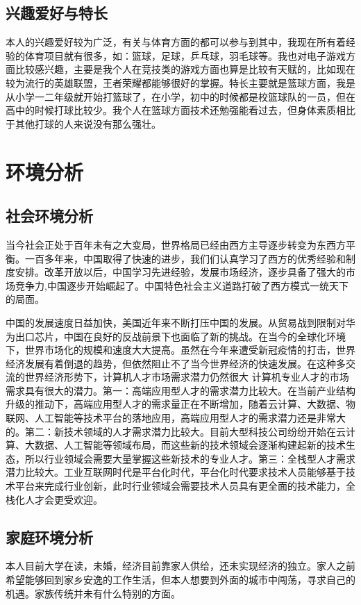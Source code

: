 \documentclass{article}
\begin{document}
\subsection{兴趣爱好与特长}
本人的兴趣爱好较为广泛，有关与体育方面的都可以参与到其中，我现在所有着经验的体育项目就有很多，如：篮球，足球，乒乓球，羽毛球等。我也对电子游戏方面比较感兴趣，主要是我个人在竞技类的游戏方面也算是比较有天赋的，比如现在较为流行的英雄联盟，王者荣耀都能够很好的掌握。特长主要就是篮球方面，我是从小学一二年级就开始打篮球了，在小学，初中的时候都是校篮球队的一员，但在高中的时候打球比较少。我个人在篮球方面技术还勉强能看过去，但身体素质相比于其他打球的人来说没有那么强壮。
\section{环境分析}
\subsection{社会环境分析}
当今社会正处于百年未有之大变局，世界格局已经由西方主导逐步转变为东西方平衡。一百多年来，中国取得了快速的进步，我们们认真学习了西方的优秀经验和制度安排。改革开放以后，中国学习先进经验，发展市场经济，逐步具备了强大的市场竞争力,中国逐步开始崛起了。中国特色社会主义道路打破了西方模式一统天下的局面。\par
中国的发展速度日益加快，美国近年来不断打压中国的发展。从贸易战到限制对华为出口芯片，中国在良好的反战前景下也面临了新的挑战。在当今的全球化环境下，世界市场化的规模和速度大大提高。虽然在今年来遭受新冠疫情的打击，世界经济发展有着倒退的趋势，但依然阻止不了当今世界经济的快速发展。在这种多交流的世界经济形势下，计算机人才市场需求潜力仍然很大 计算机专业人才的市场需求具有很大的潜力。第一：高端应用型人才的需求潜力比较大。在当前产业结构升级的推动下，高端应用型人才的需求量正在不断增加，随着云计算、大数据、物联网、人工智能等技术平台的落地应用，高端应用型人才的需求潜力还是非常大的。第二：新技术领域的人才需求潜力比较大。目前大型科技公司纷纷开始在云计算、大数据、人工智能等领域布局，而这些新的技术领域会逐渐构建起新的技术生态，所以行业领域会需要大量掌握这些新技术的专业人才。第三：全栈型人才需求潜力比较大。工业互联网时代是平台化时代，平台化时代要求技术人员能够基于技术平台来完成行业创新，此时行业领域会需要技术人员具有更全面的技术能力，全栈化人才会更受欢迎。
\subsection{家庭环境分析}
本人目前大学在读，未婚，经济目前靠家人供给，还未实现经济的独立。家人之前希望能够回到家乡安逸的工作生活，但本人想要到外面的城市中闯荡，寻求自己的机遇。家族传统并未有什么特别的方面。
\end{document}
